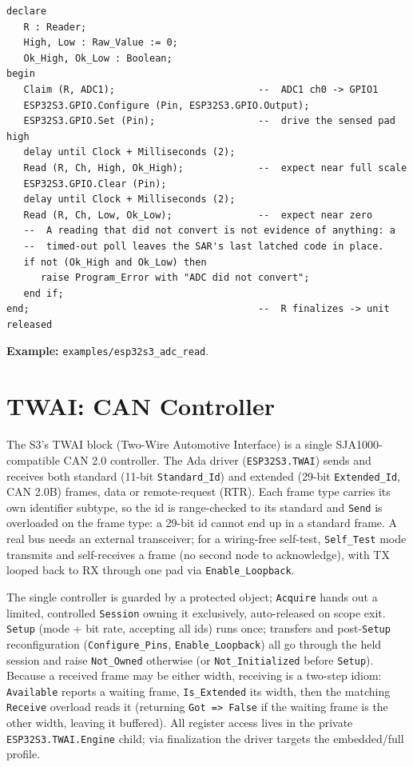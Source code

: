 \begin{lstlisting}
declare
   R : Reader;
   High, Low : Raw_Value := 0;
   Ok_High, Ok_Low : Boolean;
begin
   Claim (R, ADC1);                         --  ADC1 ch0 -> GPIO1
   ESP32S3.GPIO.Configure (Pin, ESP32S3.GPIO.Output);
   ESP32S3.GPIO.Set (Pin);                  --  drive the sensed pad high
   delay until Clock + Milliseconds (2);
   Read (R, Ch, High, Ok_High);             --  expect near full scale
   ESP32S3.GPIO.Clear (Pin);
   delay until Clock + Milliseconds (2);
   Read (R, Ch, Low, Ok_Low);               --  expect near zero
   --  A reading that did not convert is not evidence of anything: a
   --  timed-out poll leaves the SAR's last latched code in place.
   if not (Ok_High and Ok_Low) then
      raise Program_Error with "ADC did not convert";
   end if;
end;                                        --  R finalizes -> unit released
\end{lstlisting}

\noindent\textbf{Example:} \texttt{examples/esp32s3\_adc\_read}.

\section{TWAI: CAN Controller}
\label{app:int:twai}

The S3's TWAI block (Two-Wire Automotive Interface) is a single
SJA1000-compatible CAN 2.0 controller. The Ada driver (\texttt{ESP32S3.TWAI})
sends and receives both standard (11-bit \texttt{Standard\_Id}) and extended
(29-bit \texttt{Extended\_Id}, CAN 2.0B) frames, data or remote-request (RTR).
Each frame type carries its own identifier subtype, so the id is range-checked to
its standard and \texttt{Send} is overloaded on the frame type: a 29-bit id
cannot end up in a standard frame. A real bus needs an external transceiver; for a
wiring-free self-test, \texttt{Self\_Test} mode transmits and self-receives a
frame (no second node to acknowledge), with TX looped back to RX through one pad
via \texttt{Enable\_Loopback}.

The single controller is guarded by a protected object; \texttt{Acquire} hands out
a limited, controlled \texttt{Session} owning it exclusively, auto-released on
scope exit. \texttt{Setup} (mode + bit rate, accepting all ids) runs once;
transfers and post-\texttt{Setup} reconfiguration (\texttt{Configure\_Pins},
\texttt{Enable\_Loopback}) all go through the held session and raise
\texttt{Not\_Owned} otherwise (or \texttt{Not\_Initialized} before \texttt{Setup}).
Because a received frame may be either width, receiving is a two-step idiom:
\texttt{Available} reports a waiting frame, \texttt{Is\_Extended} its width, then
the matching \texttt{Receive} overload reads it (returning \texttt{Got => False}
if the waiting frame is the other width, leaving it buffered). All register access
lives in the private \texttt{ESP32S3.TWAI.Engine} child; via finalization the
driver targets the embedded/full profile.

